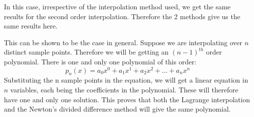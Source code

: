 \documentclass[12,a4paper]{article}
\begin{document}
    In this case, irrespective of the interpolation method used, we get the same results for the second order interpolation. Therefore the 2 methods give us the same results here.
    
    This can be shown to be the case in general. Suppose we are interpolating over $n$ distinct sample points. Therefore we will be getting an $(n-1)^{th}$ order polynomial. There is one and only one polynomial of this order:
    \begin{equation}
        \nonumber
        p_n(x) = a_0x^0 + a_1x^1 + a_2x^2 + ... + a_nx^n
    \end{equation}
    Substituting the n sample points in the equation, we will get a linear equation in $n$ variables, each being the coefficients in the polynomial. These will therefore have one and only one solution. This proves that both the Lagrange interpolation and the Newton's divided difference method will give the same polynomial.
    \newpage
\end{document}
